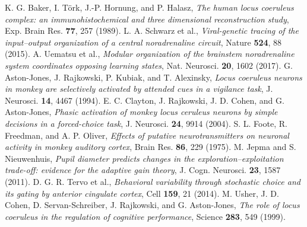  K. G. Baker, I. T\"ork, J.-P. Hornung, and P. Halasz, \emph{The human locus coeruleus complex: an immunohistochemical and three dimensional reconstruction study}, Exp. Brain Res. \textbf{77}, 257 (1989).
 L. A. Schwarz et al., \emph{Viral-genetic tracing of the input--output organization of a central noradrenaline circuit}, Nature \textbf{524}, 88 (2015).
 A. Uematsu et al., \emph{Modular organization of the brainstem noradrenaline system coordinates opposing learning states}, Nat. Neurosci. \textbf{20}, 1602 (2017).
 G. Aston-Jones, J. Rajkowski, P. Kubiak, and T. Alexinsky, \emph{Locus coeruleus neurons in monkey are selectively activated by attended cues in a vigilance task}, J. Neurosci. \textbf{14}, 4467 (1994).
 E. C. Clayton, J. Rajkowski, J. D. Cohen, and G. Aston-Jones, \emph{Phasic activation of monkey locus ceruleus neurons by simple decisions in a forced-choice task}, J. Neurosci. \textbf{24}, 9914 (2004).
 S. L. Foote, R. Freedman, and A. P. Oliver, \emph{Effects of putative neurotransmitters on neuronal activity in monkey auditory cortex}, Brain Res. \textbf{86}, 229 (1975).
 M. Jepma and S. Nieuwenhuis, \emph{Pupil diameter predicts changes in the exploration--exploitation trade-off: evidence for the adaptive gain theory}, J. Cogn. Neurosci. \textbf{23}, 1587 (2011).
 D. G. R. Tervo et al., \emph{Behavioral variability through stochastic choice and its gating by anterior cingulate cortex}, Cell \textbf{159}, 21 (2014).
 M. Usher, J. D. Cohen, D. Servan-Schreiber, J. Rajkowski, and G. Aston-Jones, \emph{The role of locus coeruleus in the regulation of cognitive performance}, Science \textbf{283}, 549 (1999).
